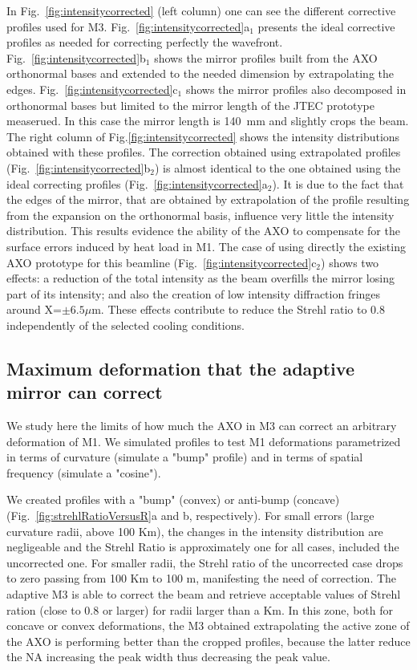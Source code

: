\documentclass[preprint]{iucr}              %
\newcommand{\inred}[1]{{\color{red}#1}}
\begin{document}
In Fig.~\ref{fig:intensitycorrected} \inred{(left column)} one can see the different corrective profiles used for M3. 
Fig.~\ref{fig:intensitycorrected}a$_1$ presents the ideal corrective profiles as needed for correcting perfectly the wavefront. Fig.~\ref{fig:intensitycorrected}b$_1$ shows the mirror profiles built from the AXO orthonormal bases and extended to the needed dimension by extrapolating the edges. Fig.~\ref{fig:intensitycorrected}c$_1$ shows the mirror profiles also decomposed in orthonormal bases but limited to the mirror length of the JTEC prototype measerued. In this case the mirror length is 140~mm and slightly crops the beam.
The right column of Fig.\ref{fig:intensitycorrected} shows the intensity distributions obtained with these profiles.
The correction obtained using extrapolated profiles (Fig.~\ref{fig:intensitycorrected}b$_2$) is almost identical to the one obtained using the ideal correcting profiles (Fig.~\ref{fig:intensitycorrected}a$_2$). It is due to the fact that the edges of the mirror, that are obtained by extrapolation of the profile resulting from the expansion on the orthonormal basis, influence very little the intensity distribution. This results evidence the ability of the AXO to compensate for the surface errors induced by heat load in M1. The case of using directly the existing AXO prototype for this beamline (Fig.~\ref{fig:intensitycorrected}c$_2$) shows two effects: a reduction of the total intensity as the beam overfills the mirror losing part of its intensity; and also the creation of low intensity diffraction fringes around X=$\pm6.5\mu$m. These effects contribute to reduce the Strehl ratio to 0.8 independently of the selected cooling conditions.


\subsection{Maximum deformation that the adaptive mirror can correct}
\label{sec:scans}

We study here the limits of how much the AXO in M3 can correct an arbitrary deformation of M1. We simulated profiles to test M1 deformations parametrized in terms of curvature (simulate a "bump" profile) and in terms of spatial frequency (simulate a "cosine"). 

We created profiles with a "bump" (convex) or anti-bump (concave) (Fig.~\ref{fig:strehlRatioVersusR}a and b, respectively).
For small errors (large curvature radii, above 100 Km), the changes in the intensity distribution are negligeable and the Strehl Ratio is approximately one for all cases, included the uncorrected one. 
For smaller radii, the Strehl ratio of the uncorrected case drops to zero passing from 100 Km to 100 m, manifesting the need of correction. The adaptive M3 is able to correct the beam and retrieve acceptable values of Strehl ration (close to 0.8 or larger) for radii larger than a Km. In this zone, both for concave or convex deformations, the M3 obtained extrapolating the active zone of the AXO is performing better than the cropped profiles, because the latter reduce the NA increasing the peak width thus decreasing the peak value. 
\end{document}
